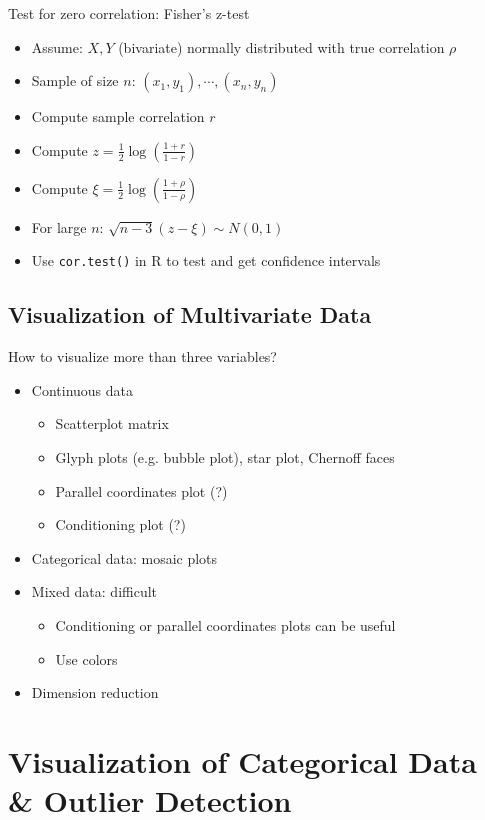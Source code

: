 \documentclass[a4paper]{article}
\begin{document}
Test for zero correlation: Fisher's z-test
\begin{itemize}
    \item Assume: $X, Y$ (bivariate) normally distributed with true correlation $\rho$
    \item Sample of size $n$: $(x_1,y_1),\cdots,(x_n,y_n)$
    \item Compute sample correlation $r$
    \item Compute $z=\frac{1}{2}\log\left(\frac{1+r}{1-r} \right)$
    \item Compute $\xi=\frac{1}{2}\log\left(\frac{1+\rho}{1-\rho} \right)$
    \item For large $n$: $\sqrt{n-3}(z-\xi)\sim N(0, 1)$
    \item Use \texttt{cor.test()} in R to test and get confidence intervals
\end{itemize}

\subsection{Visualization of Multivariate Data}

How to visualize more than three variables?
\begin{itemize}
    \item Continuous data
    \begin{itemize}
        \item Scatterplot matrix
        \item Glyph plots (e.g. bubble plot), star plot, Chernoff faces
        \item Parallel coordinates plot (?)
        \item Conditioning plot (?)
    \end{itemize}
    \item Categorical data: mosaic plots
    \item Mixed data: difficult
    \begin{itemize}
        \item Conditioning or parallel coordinates plots can be useful
        \item Use colors
    \end{itemize}
    \item Dimension reduction
\end{itemize}

\section{Visualization of Categorical Data \& Outlier Detection}
\end{document}
